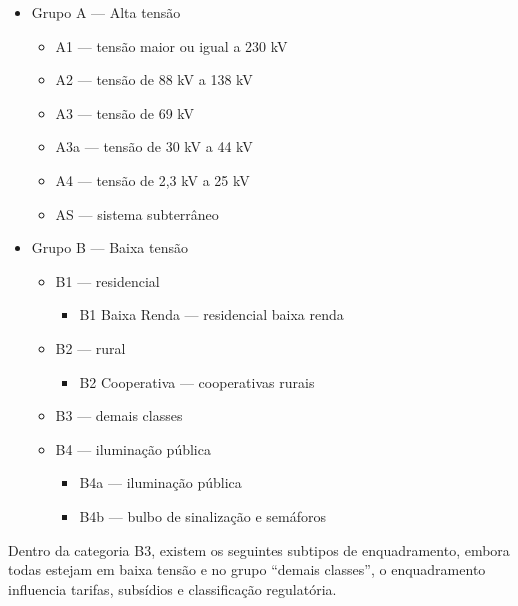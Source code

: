 \documentclass[12pt,a4paper]{article}
\begin{document}
\begin{itemize}
    
    \item Grupo A --- Alta tensão
    \begin{itemize}
        \item A1 --- tensão maior ou igual a 230 kV
        \item A2 --- tensão de 88 kV a 138 kV
        \item A3 --- tensão de 69 kV
        \item A3a --- tensão de 30 kV a 44 kV
        \item A4 --- tensão de 2,3 kV a 25 kV
        \item AS --- sistema subterrâneo
    \end{itemize}

    \item Grupo B --- Baixa tensão
    \begin{itemize}
        \item B1 --- residencial
        \begin{itemize}
            \item B1 Baixa Renda --- residencial baixa renda
        \end{itemize}

        \item B2 --- rural
        \begin{itemize}
            \item B2 Cooperativa --- cooperativas rurais
        \end{itemize}

        \item B3 --- demais classes

        \item B4 --- iluminação pública
        \begin{itemize}
            \item B4a --- iluminação pública
            \item B4b --- bulbo de sinalização e semáforos
        \end{itemize}

    \end{itemize}

\end{itemize}

Dentro da categoria B3, existem os seguintes subtipos de enquadramento, embora todas estejam em baixa tensão e no grupo “demais classes”, o enquadramento influencia tarifas, subsídios e classificação regulatória.
\end{document}
